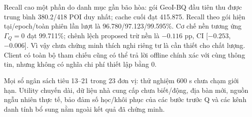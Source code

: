 Recall cao một phần do danh mục gần bão hòa: gói GeoI-BQ đầu tiên thu được
trung bình 380.2/418 POI duy nhất; cache cuối đạt 415.875.
Recall theo gói hiện tại/epoch/toàn phiên lần lượt là
96.780/97.123/99.595\%.
Cơ chế nền tương ứng $\Gamma_Q=0$ đạt 99.711\%; chênh lệch proposed trừ nền
là $-0.116$ pp, CI [$-0.253$,$-0.006$]. Vì vậy chưa chứng minh thích nghi
riêng tư là cần thiết cho chất lượng. Client có toàn bộ tham chiếu cũng có
thể trả lời offline chính xác với cùng thông tin, nhưng không có nghĩa chi
phí thiết lập bằng 0.

Mọi sổ ngân sách tiêu 13--21 trong 23 đơn vị: thử nghiệm 600 s chưa chạm
giới hạn. Utility chuyến dài, dữ liệu nhà cung cấp chưa biết/động, địa bàn
mới, nguồn ngẫu nhiên thực tế, bảo đảm số học/khôi phục của các bước trước Q
và các kênh danh tính bổ sung nằm ngoài kết quả đã chứng minh.
